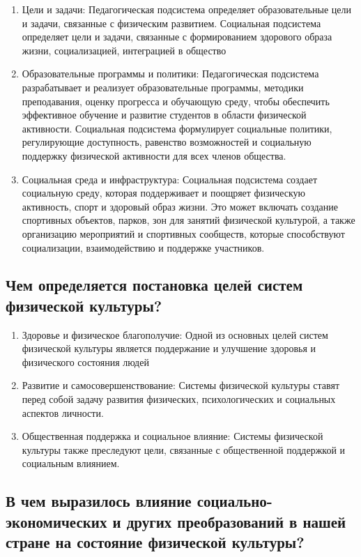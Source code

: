 \begin{enumerate}
    \item Цели и задачи: Педагогическая подсистема определяет образовательные цели и задачи, связанные с физическим развитием. Социальная подсистема определяет цели и задачи, связанные с формированием здорового образа жизни, социализацией, интеграцией в общество
    \item Образовательные программы и политики: Педагогическая подсистема разрабатывает и реализует образовательные программы, методики преподавания, оценку прогресса и обучающую среду, чтобы обеспечить эффективное обучение и развитие студентов в области физической активности. Социальная подсистема формулирует социальные политики, регулирующие доступность, равенство возможностей и социальную поддержку физической активности для всех членов общества.
    \item Социальная среда и инфраструктура: Социальная подсистема создает социальную среду, которая поддерживает и поощряет физическую активность, спорт и здоровый образ жизни. Это может включать создание спортивных объектов, парков, зон для занятий физической культурой, а также организацию мероприятий и спортивных сообществ, которые способствуют социализации, взаимодействию и поддержке участников.
\end{enumerate}

\subsection{Чем определяется постановка целей систем физической культуры?}

\begin{enumerate}
    \item Здоровье и физическое благополучие: Одной из основных целей систем физической культуры является поддержание и улучшение здоровья и физического состояния людей
    \item Развитие и самосовершенствование: Системы физической культуры ставят перед собой задачу развития физических, психологических и социальных аспектов личности.
    \item Общественная поддержка и социальное влияние: Системы физической культуры также преследуют цели, связанные с общественной поддержкой и социальным влиянием.
\end{enumerate}

\subsection{В чем выразилось влияние социально-экономических и других преобразований в нашей стране на состояние физической культуры?}

